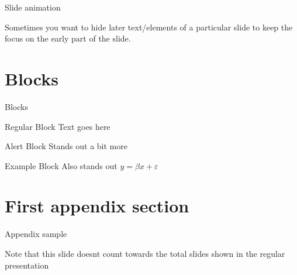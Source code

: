 \documentclass[12pt]{beamer}
\begin{document}
\begin{frame}{Slide animation}

	Sometimes you want to hide later text/elements of a particular slide to keep the focus on the early part of the slide.

	\bigskip


\end{frame}



\section{Blocks}

\begin{frame}{Blocks}

	\begin{block}{Regular Block}
		Text goes here
	\end{block}

	\begin{alertblock}{Alert Block}
		Stands out a bit more
	\end{alertblock}

	\begin{exampleblock}{Example Block}
		Also stands out $y=\beta x+ \varepsilon$
	\end{exampleblock}

\end{frame}



\appendix

{\BackgroundShaded
\begin{frame}
\end{frame}
}



\section{First appendix section}

\begin{frame}{Appendix sample}

	Note that this slide doesnt count towards the total slides shown in the regular presentation

\end{frame}



\end{document}

